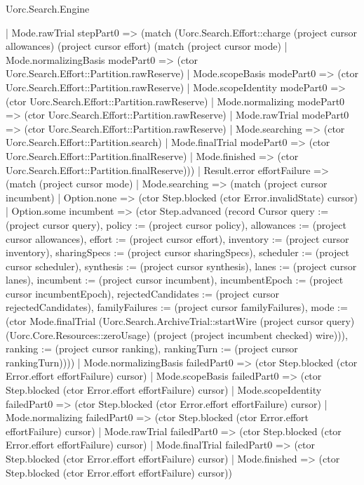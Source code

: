 \begin{lexlean}{Uorc.Search.Engine}
\begin{semanticmodule}
{    | Mode.rawTrial stepPart0 => (match (Uorc.Search.Effort::charge (project cursor allowances) (project cursor effort) (match (project cursor mode)
        | Mode.normalizingBasis modePart0 => (ctor Uorc.Search.Effort::Partition.rawReserve)
        | Mode.scopeBasis modePart0 => (ctor Uorc.Search.Effort::Partition.rawReserve)
        | Mode.scopeIdentity modePart0 => (ctor Uorc.Search.Effort::Partition.rawReserve)
        | Mode.normalizing modePart0 => (ctor Uorc.Search.Effort::Partition.rawReserve)
        | Mode.rawTrial modePart0 => (ctor Uorc.Search.Effort::Partition.rawReserve)
        | Mode.searching => (ctor Uorc.Search.Effort::Partition.search)
        | Mode.finalTrial modePart0 => (ctor Uorc.Search.Effort::Partition.finalReserve)
        | Mode.finished => (ctor Uorc.Search.Effort::Partition.finalReserve)))
      | Result.error effortFailure => (match (project cursor mode)
        | Mode.searching => (match (project cursor incumbent)
          | Option.none => (ctor Step.blocked (ctor Error.invalidState) cursor)
          | Option.some incumbent => (ctor Step.advanced (record Cursor {query := (project cursor query), policy := (project cursor policy), allowances := (project cursor allowances), effort := (project cursor effort), inventory := (project cursor inventory), sharingSpecs := (project cursor sharingSpecs), scheduler := (project cursor scheduler), synthesis := (project cursor synthesis), lanes := (project cursor lanes), incumbent := (project cursor incumbent), incumbentEpoch := (project cursor incumbentEpoch), rejectedCandidates := (project cursor rejectedCandidates), familyFailures := (project cursor familyFailures), mode := (ctor Mode.finalTrial (Uorc.Search.ArchiveTrial::startWire (project cursor query) (Uorc.Core.Resources::zeroUsage) (project (project incumbent checked) wire))), ranking := (project cursor ranking), rankingTurn := (project cursor rankingTurn)})))
        | Mode.normalizingBasis failedPart0 => (ctor Step.blocked (ctor Error.effort effortFailure) cursor)
        | Mode.scopeBasis failedPart0 => (ctor Step.blocked (ctor Error.effort effortFailure) cursor)
        | Mode.scopeIdentity failedPart0 => (ctor Step.blocked (ctor Error.effort effortFailure) cursor)
        | Mode.normalizing failedPart0 => (ctor Step.blocked (ctor Error.effort effortFailure) cursor)
        | Mode.rawTrial failedPart0 => (ctor Step.blocked (ctor Error.effort effortFailure) cursor)
        | Mode.finalTrial failedPart0 => (ctor Step.blocked (ctor Error.effort effortFailure) cursor)
        | Mode.finished => (ctor Step.blocked (ctor Error.effort effortFailure) cursor))
}
\end{semanticmodule}
\end{lexlean}
